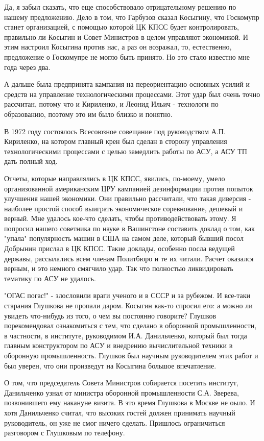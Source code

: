 Да, я забыл сказать, что еще способствовало отрицательному решению по нашему
предложению. Дело в том, что Гарбузов сказал Косыгину, что Госкомупр станет
организацией, с помощью которой ЦК КПСС будет контролировать, правильно ли
Косыгин и Совет Министров в целом управляют экономикой. И этим настроил Косыгина
против нас, а раз он возражал, то, естественно, предложение о Госкомупре не
могло быть принято. Но это стало известно мне года через два.

А дальше была предпринята кампания на переориентацию основных усилий и средств
на управление технологическими процессами. Этот удар был очень точно рассчитан,
потому что и Кириленко, и Леонид Ильич - технологи по образованию, поэтому это
им было близко и понятно.

В 1972 году состоялось Всесоюзное совещание под руководством А.П. Кириленко, на
котором главный крен был сделан в сторону управления технологическими процессами
с целью замедлить работы по АСУ, а АСУ ТП дать полный ход.

Отчеты, которые направлялись в ЦК КПСС, явились, по-моему, умело организованной
американским ЦРУ кампанией дезинформации против попыток улучшения нашей
экономики. Они правильно рассчитали, что такая диверсия - наиболее простой
способ выиграть экономическое соревнование, дешевый и верный. Мне удалось
кое-что сделать, чтобы противодействовать этому. Я попросил нашего советника по
науке в Вашингтоне составить доклад о том, как "упала" популярность машин в США
на самом деле, который бывший посол Добрынин прислал в ЦК КПСС. Такие доклады,
особенно посла ведущей державы, рассылались всем членам Политбюро и те их
читали. Расчет оказался верным, и это немного смягчило удар. Так что полностью
ликвидировать тематику по АСУ не удалось.

"ОГАС погас!" - злословили враги ученого и в СССР и за рубежом. И все-таки
старания Глушкова не пропали даром. Косыгин как-то спросил его: а можно ли
увидеть что-нибудь из того, о чем вы постоянно говорите? Глушков порекомендовал
ознакомиться с тем, что сделано в оборонной промышленности, в частности, в
институте, руководимом И.А. Данильченко, который был тогда главным конструктором
по АСУ и внедрению вычислительной техники в оборонную промышленность. Глушков
был научным руководителем этих работ и был уверен, что они произведут на
Косыгина большое впечатление.

О том, что председатель Совета Министров собирается посетить институт,
Данильченко узнал от министра оборонной промышленности С.А. Зверева,
позвонившего ему накануне визита. В это время Глушкова в Москве не оыло. И хотя
Данильченко считал, что высоких гостей должен принимать научный руководитель, он
уже не смог ничего сделать. Пришлось ограничиться разговором с Глушковым по
телефону.

